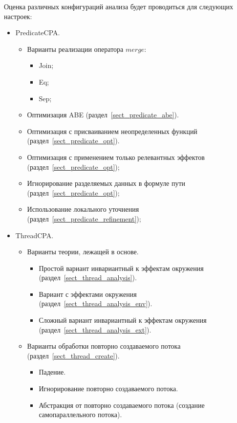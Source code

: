 Оценка различных конфигураций анализа будет проводиться для следующих настроек:
\begin{itemize}
\item PredicateCPA.
\begin{itemize}
\item Варианты реализации оператора $merge$:
\begin{itemize}
\item Join;
\item Eq;
\item Sep;
\end{itemize}
\item Оптимизация ABE (раздел~\ref{sect_predicate_abe}).
\item Оптимизация с присваиванием неопределенных функций (раздел~\ref{sect_predicate_opt}).
\item Оптимизация с применением только релевантных эффектов (раздел~\ref{sect_predicate_opt});
\item Игнорирование разделяемых данных в формуле пути (раздел~\ref{sect_predicate_opt});
\item Использование локального уточнения (раздел~\ref{sect_predicate_refinement});
\end{itemize}
\item ThreadCPA.
\begin{itemize}
\item Варианты теории, лежащей в основе.
\begin{itemize}
\item Простой вариант инвариантный к эффектам окружения (раздел~\ref{sect_thread_analysis}).
\item Вариант с эффектами окружения (раздел~\ref{sect_thread_analysis_env}).
\item Сложный вариант инвариантный к эффектам окружения (раздел~\ref{sect_thread_analysis_ext}).
\end{itemize}
\item Варианты обработки повторно создаваемого потока (раздел~\ref{sect_thread_create}).
\begin{itemize}
\item Падение.
\item Игнорирование повторно создаваемого потока.
\item Абстракция от повторно создаваемого потока (создание самопараллельного потока).
\end{itemize}
\end{itemize}

\end{itemize}
